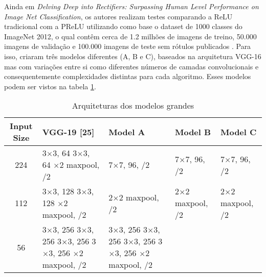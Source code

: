 Ainda em \textit{Delving Deep into Rectifiers: Surpassing Human Level Performance on Image Net Classification}, os autores realizam testes comparando a ReLU tradicional com a PReLU utilizando como base o dataset de 1000 classes do ImageNet 2012, o qual contêm cerca de 1.2 milhões de imagens de treino, 50.000 imagens de validação e 100.000 imagens de teste sem rótulos publicados \parencite{PReLUArticle}. Para isso, \textcite{PReLUArticle} criaram três modelos diferentes (A, B e C), baseados na arquitetura VGG-16 mas com variações entre si como diferentes números de camadas convolucionais e consequentemente complexidades distintas para cada algoritmo. Esses modelos podem ser vistos na tabela \ref{tab:arquitetura-prelu}. 

\begin{table}
    \centering
    \begin{threeparttable}
        \caption{Arquiteturas dos modelos grandes}
        \label{tab:arquitetura-prelu}
        \begin{tabular}{cllll}
            \toprule
            \textbf{Input Size} & \textbf{VGG-19 [25]} & \textbf{Model A} & \textbf{Model B} & \textbf{Model C} \\
            \midrule
            224
              & \makecell[l]{3$\times$3, 64 \\ 3$\times$3, 64 \\ \addlinespace 2$\times$2 maxpool, /2}
              & 7$\times$7, 96, /2
              & 7$\times$7, 96, /2
              & 7$\times$7, 96, /2 \\
            \midrule
            112
              & \makecell[l]{3$\times$3, 128 \\ 3$\times$3, 128 \\ \addlinespace 2$\times$2 maxpool, /2}
              & 2$\times$2 maxpool, /2
              & 2$\times$2 maxpool, /2
              & 2$\times$2 maxpool, /2 \\
            \midrule
            56
              & \makecell[l]{3$\times$3, 256 \\ 3$\times$3, 256 \\ 3$\times$3, 256 \\ 3$\times$3, 256 \\ \addlinespace 2$\times$2 maxpool, /2}
              & \makecell[l]{3$\times$3, 256 \\ 3$\times$3, 256 \\ 3$\times$3, 256 \\ 3$\times$3, 256 \\ \addlinespace 2$\times$2 maxpool, /2}

\end{tabular}
\end{threeparttable}
\end{table}
